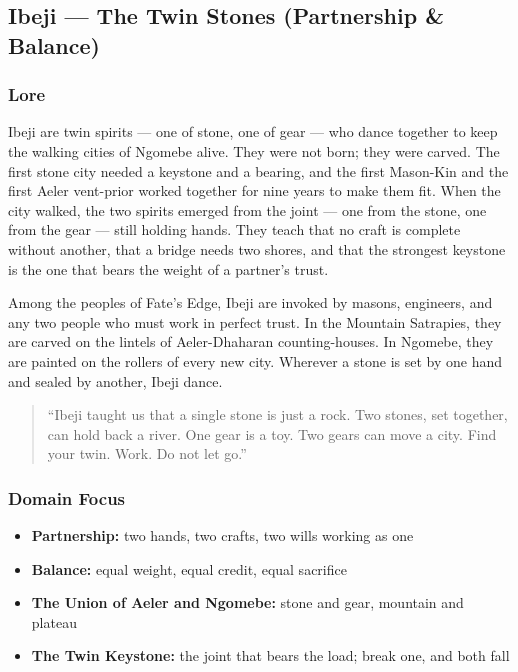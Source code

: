 
\subsection{Ibeji --- The Twin Stones (Partnership \& Balance)}

\subsubsection*{Lore}
Ibeji are twin spirits --- one of stone, one of gear --- who dance together to keep the walking cities of Ngomebe alive. They were not born; they were carved. The first stone city needed a keystone and a bearing, and the first Mason-Kin and the first Aeler vent-prior worked together for nine years to make them fit. When the city walked, the two spirits emerged from the joint --- one from the stone, one from the gear --- still holding hands. They teach that no craft is complete without another, that a bridge needs two shores, and that the strongest keystone is the one that bears the weight of a partner's trust.

Among the peoples of Fate's Edge, Ibeji are invoked by masons, engineers, and any two people who must work in perfect trust. In the Mountain Satrapies, they are carved on the lintels of Aeler-Dhaharan counting-houses. In Ngomebe, they are painted on the rollers of every new city. Wherever a stone is set by one hand and sealed by another, Ibeji dance.

\begin{quote}
``Ibeji taught us that a single stone is just a rock. Two stones, set together, can hold back a river. One gear is a toy. Two gears can move a city. Find your twin. Work. Do not let go.''
\end{quote}

\subsubsection*{Domain Focus}
\begin{itemize}
  \item \textbf{Partnership:} two hands, two crafts, two wills working as one
  \item \textbf{Balance:} equal weight, equal credit, equal sacrifice
  \item \textbf{The Union of Aeler and Ngomebe:} stone and gear, mountain and plateau
  \item \textbf{The Twin Keystone:} the joint that bears the load; break one, and both fall
\end{itemize}

